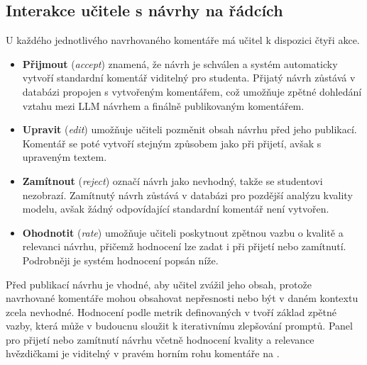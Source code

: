 \subsection{Interakce učitele s návrhy na řádcích}
\label{subsec:implementation-interaction}

U každého jednotlivého navrhovaného komentáře má učitel k dispozici čtyři akce.

\begin{itemize}
    \item \textbf{Přijmout} (\textit{accept}) znamená, že návrh je schválen a systém automaticky vytvoří standardní komentář viditelný pro studenta.
    Přijatý návrh zůstává v databázi propojen s vytvořeným komentářem, což umožňuje zpětné dohledání vztahu mezi LLM návrhem a finálně publikovaným komentářem.

    \item \textbf{Upravit} (\textit{edit}) umožňuje učiteli pozměnit obsah návrhu před jeho publikací.
    Komentář se poté vytvoří stejným způsobem jako při přijetí, avšak s upraveným textem.

    \item \textbf{Zamítnout} (\textit{reject}) označí návrh jako nevhodný, takže se studentovi nezobrazí.
    Zamítnutý návrh zůstává v databázi pro pozdější analýzu kvality modelu, avšak žádný odpovídající standardní komentář není vytvořen.

    \item \textbf{Ohodnotit} (\textit{rate}) umožňuje učiteli poskytnout zpětnou vazbu o kvalitě a relevanci návrhu, přičemž hodnocení lze zadat i při přijetí nebo zamítnutí.
    Podrobněji je systém hodnocení popsán níže.
\end{itemize}

Před publikací návrhu je vhodné, aby učitel zvážil jeho obsah, protože navrhované komentáře mohou obsahovat nepřesnosti nebo být v daném kontextu zcela nevhodné.
Hodnocení podle metrik definovaných v  tvoří základ zpětné vazby, která může v budoucnu sloužit k iterativnímu zlepšování promptů.
Panel pro přijetí nebo zamítnutí návrhu včetně hodnocení kvality a relevance hvězdičkami je viditelný v pravém horním rohu komentáře na .

\endinput